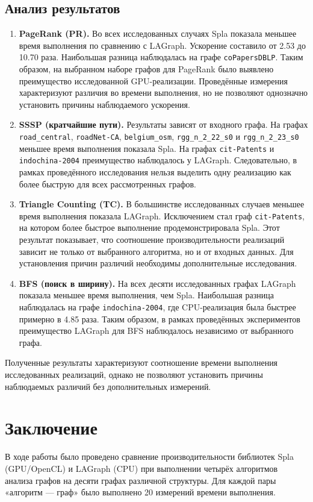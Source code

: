 \documentclass[a4paper]{article}
\begin{document}
\subsection{Анализ результатов}
\begin{enumerate}
\item \textbf{PageRank (PR).}
Во всех исследованных случаях Spla показала меньшее время
выполнения по сравнению с LAGraph. Ускорение составило
от 2.53 до 10.70 раза. Наибольшая разница наблюдалась
на графе \texttt{coPapersDBLP}. Таким образом, на выбранном
наборе графов для PageRank было выявлено преимущество
исследованной GPU-реализации. Проведённые измерения
характеризуют различия во времени выполнения, но не
позволяют однозначно установить причины наблюдаемого
ускорения.
\item \textbf{SSSP (кратчайшие пути).}
Результаты зависят от входного графа. На графах
\texttt{road\_central}, \texttt{roadNet-CA},
\texttt{belgium\_osm}, \texttt{rgg\_n\_2\_22\_s0}
и \texttt{rgg\_n\_2\_23\_s0} меньшее время выполнения
показала Spla. На графах \texttt{cit-Patents} и
\texttt{indochina-2004} преимущество наблюдалось у
LAGraph. Следовательно, в рамках проведённого исследования
нельзя выделить одну реализацию как более быструю для
всех рассмотренных графов.
\item \textbf{Triangle Counting (TC).}
В большинстве исследованных случаев меньшее время
выполнения показала LAGraph. Исключением стал граф
\texttt{cit-Patents}, на котором более быстрое выполнение
продемонстрировала Spla. Этот результат показывает,
что соотношение производительности реализаций зависит
не только от выбранного алгоритма, но и от входных данных.
Для установления причин различий необходимы
дополнительные исследования.
\item \textbf{BFS (поиск в ширину).}
На всех десяти исследованных графах LAGraph показала
меньшее время выполнения, чем Spla. Наибольшая разница
наблюдалась на графе \texttt{indochina-2004}, где
CPU-реализация была быстрее примерно в 4.85 раза.
Таким образом, в рамках проведённых экспериментов
преимущество LAGraph для BFS наблюдалось независимо
от выбранного графа.
\end{enumerate}
Полученные результаты характеризуют соотношение времени выполнения исследованных реализаций, однако не позволяют установить причины наблюдаемых различий без дополнительных измерений.

\section{Заключение}
В ходе работы было проведено сравнение производительности библиотек Spla (GPU/OpenCL) и LAGraph (CPU) при выполнении четырёх алгоритмов анализа графов на десяти графах различной структуры. Для каждой пары «алгоритм — граф» было выполнено 20 измерений времени выполнения.
\end{document}
